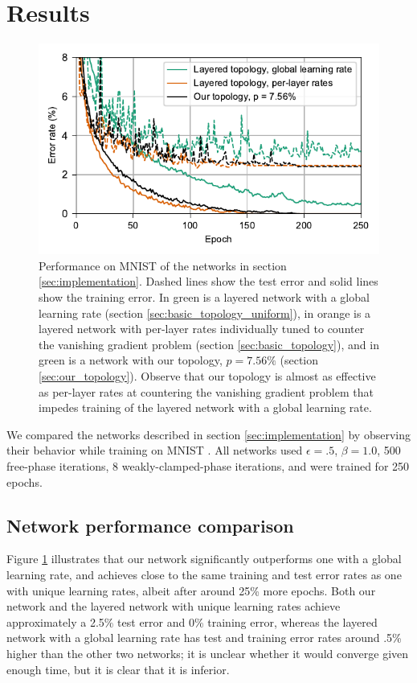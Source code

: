\documentclass[format=sigconf]{acmart}
\begin{document}
\section{Results}

\begin{figure}
  \centering
  \includegraphics[width=\columnwidth]{figures/MNIST_network_comparison.pdf}
  \caption{Performance on MNIST of the networks in section \ref{sec:implementation}. Dashed lines show the test error and solid lines show the training error. In green is a layered network with a global learning rate (section \ref{sec:basic_topology_uniform}), in orange is a layered network with per-layer rates individually tuned to counter the vanishing gradient problem (section \ref{sec:basic_topology}), and in green is a network with our topology, $p=7.56\%$ (section \ref{sec:our_topology}). Observe that our topology is almost as effective as per-layer rates at countering the vanishing gradient problem that impedes training of the layered network with a global learning rate.}
  \label{fig:mnist_comparison}
\end{figure}

We compared the networks described in section \ref{sec:implementation} by observing their behavior while training on MNIST \cite{mnist1998}. All networks used $\epsilon=.5$, $\beta=1.0$, 500 free-phase iterations, 8 weakly-clamped-phase iterations, and were trained for 250 epochs.

\subsection{Network performance comparison}
\label{sec:network_performance}

Figure \ref{fig:mnist_comparison} illustrates that our network significantly outperforms one with a global learning rate, and achieves close to the same training and test error rates as one with unique learning rates, albeit after around 25\% more epochs. Both our network and the layered network with unique learning rates achieve approximately a 2.5\% test error and 0\% training error, whereas the layered network with a global learning rate has test and training error rates around .5\% higher than the other two networks; it is unclear whether it would converge given enough time, but it is clear that it is inferior.
\end{document}
